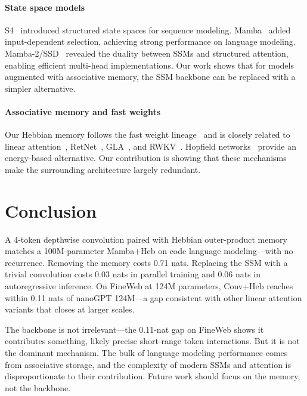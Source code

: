 \documentclass{article}
\begin{document}
\paragraph{State space models}
S4~\citep{gu2022efficiently} introduced structured state spaces for sequence modeling. Mamba~\citep{gu2024mamba} added input-dependent selection, achieving strong performance on language modeling. Mamba-2/SSD~\citep{dao2024mamba2} revealed the duality between SSMs and structured attention, enabling efficient multi-head implementations. Our work shows that for models augmented with associative memory, the SSM backbone can be replaced with a simpler alternative.

\paragraph{Associative memory and fast weights}
Our Hebbian memory follows the fast weight lineage~\citep{schmidhuber1992learning,ba2016using,schlag2021linear} and is closely related to linear attention~\citep{katharopoulos2020transformers}, RetNet~\citep{sun2023retentive}, GLA~\citep{yang2024gated}, and RWKV~\citep{peng2023rwkv}. Hopfield networks~\citep{hopfield1982neural,ramsauer2021hopfield} provide an energy-based alternative. Our contribution is showing that these mechanisms make the surrounding architecture largely redundant.

\section{Conclusion}

A 4-token depthwise convolution paired with Hebbian outer-product memory matches a 100M-parameter Mamba+Heb on code language modeling---with no recurrence. Removing the memory costs 0.71 nats. Replacing the SSM with a trivial convolution costs 0.03 nats in parallel training and 0.06 nats in autoregressive inference. On FineWeb at 124M parameters, Conv+Heb reaches within 0.11 nats of nanoGPT 124M---a gap consistent with other linear attention variants that closes at larger scales.

The backbone is not irrelevant---the 0.11-nat gap on FineWeb shows it contributes something, likely precise short-range token interactions. But it is not the dominant mechanism. The bulk of language modeling performance comes from associative storage, and the complexity of modern SSMs and attention is disproportionate to their contribution. Future work should focus on the memory, not the backbone.



\end{document}
